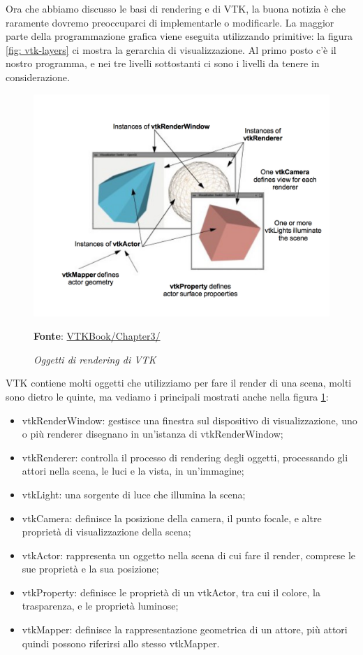 Ora che abbiamo discusso le basi di rendering e di VTK, la buona notizia è che raramente dovremo preoccuparci di implementarle o modificarle. La maggior parte della programmazione grafica viene eseguita utilizzando primitive: la figura \ref{fig: vtk-layers} ci mostra la gerarchia di visualizzazione. Al primo posto c'è il nostro programma, e nei tre livelli sottostanti ci sono i livelli da tenere in considerazione.

\begin{figure}[h]
    \centering
    \includegraphics[scale=0.5]{immagini/volumerendering/vtkobjects.png}
    \caption{\textit{Oggetti di rendering di VTK}}
    \textbf{Fonte}: \href{https://lorensen.github.io/VTKExamples/site/VTKBook/03Chapter3/}{VTKBook/Chapter3/}
    \label{fig: Oggetti Rendering VTK}
\end{figure}

VTK contiene molti oggetti che utilizziamo per fare il render di una scena, molti sono dietro le quinte, ma vediamo i principali mostrati anche nella figura \ref{fig: Oggetti Rendering VTK}:
\begin{itemize}
\item vtkRenderWindow: gestisce una finestra sul dispositivo di visualizzazione, uno o più renderer disegnano in un'istanza di vtkRenderWindow;
\item vtkRenderer: controlla il processo di rendering degli oggetti, processando gli attori nella scena, le luci e la vista, in un'immagine;
\item vtkLight: una sorgente di luce che illumina la scena;
\item vtkCamera: definisce la posizione della camera, il punto focale, e altre proprietà di visualizzazione della scena;
\item vtkActor: rappresenta un oggetto nella scena di cui fare il render, comprese le sue proprietà e la sua posizione;
\item vtkProperty: definisce le proprietà di un vtkActor, tra cui il colore, la trasparenza, e le proprietà luminose;  
\item vtkMapper: definisce la rappresentazione geometrica di un attore, più attori quindi possono riferirsi allo stesso vtkMapper.
\end{itemize}

